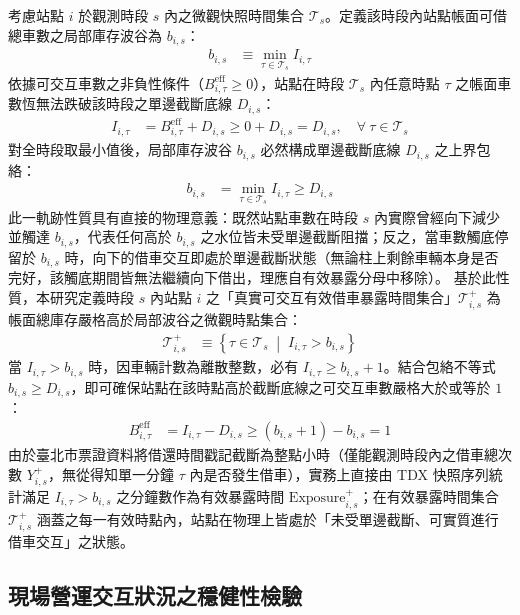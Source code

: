 考慮站點 $i$ 於觀測時段 $s$ 內之微觀快照時間集合 $\mathcal{T}_s$。定義該時段內站點帳面可借總車數之局部庫存波谷為 $b_{i,s}$：
\begin{align}
b_{i,s} &\equiv \min_{\tau \in \mathcal{T}_s} I_{i,\tau}
\end{align}
依據可交互車數之非負性條件（$B^{\text{eff}}_{i,\tau} \ge 0$），站點在時段 $\mathcal{T}_s$ 內任意時點 $\tau$ 之帳面車數恆無法跌破該時段之單邊截斷底線 $D_{i,s}$：
\begin{align}
I_{i,\tau} &= B^{\text{eff}}_{i,\tau} + D_{i,s} \ge 0 + D_{i,s} = D_{i,s}, \quad \forall\ \tau \in \mathcal{T}_s
\end{align}
對全時段取最小值後，局部庫存波谷 $b_{i,s}$ 必然構成單邊截斷底線 $D_{i,s}$ 之上界包絡：
\begin{align}
b_{i,s} &= \min_{\tau \in \mathcal{T}_s} I_{i,\tau} \ge D_{i,s}
\end{align}
此一軌跡性質具有直接的物理意義：既然站點車數在時段 $s$ 內實際曾經向下減少並觸達 $b_{i,s}$，代表任何高於 $b_{i,s}$ 之水位皆未受單邊截斷阻擋；反之，當車數觸底停留於 $b_{i,s}$ 時，向下的借車交互即處於單邊截斷狀態（無論柱上剩餘車輛本身是否完好，該觸底期間皆無法繼續向下借出，理應自有效暴露分母中移除）。
基於此性質，本研究定義時段 $s$ 內站點 $i$ 之「真實可交互有效借車暴露時間集合」$\mathcal{T}^+_{i,s}$ 為帳面總庫存嚴格高於局部波谷之微觀時點集合：
\begin{align}
\mathcal{T}^+_{i,s} &\equiv \left\{ \tau \in \mathcal{T}_s \;\middle|\; I_{i,\tau} > b_{i,s} \right\}
\end{align}
當 $I_{i,\tau} > b_{i,s}$ 時，因車輛計數為離散整數，必有 $I_{i,\tau} \ge b_{i,s} + 1$。結合包絡不等式 $b_{i,s} \ge D_{i,s}$，即可確保站點在該時點高於截斷底線之可交互車數嚴格大於或等於 $1$：
\begin{align}
B^{\text{eff}}_{i,\tau} &= I_{i,\tau} - D_{i,s} \ge \left(b_{i,s} + 1\right) - b_{i,s} = 1
\end{align}
由於臺北市票證資料將借還時間戳記截斷為整點小時（僅能觀測時段內之借車總次數 $Y^+_{i,s}$，無從得知單一分鐘 $\tau$ 內是否發生借車），實務上直接由 TDX 快照序列統計滿足 $I_{i,\tau} > b_{i,s}$ 之分鐘數作為有效暴露時間 $\text{Exposure}^+_{i,s}$；在有效暴露時間集合 $\mathcal{T}^+_{i,s}$ 涵蓋之每一有效時點內，站點在物理上皆處於「未受單邊截斷、可實質進行借車交互」之狀態。

\subsection{現場營運交互狀況之穩健性檢驗}

